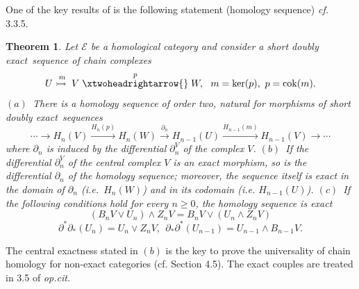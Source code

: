 \documentclass[12pt]{article}
\newtheorem{thm}{Theorem}[section]
\def\sker{{\rm ker}}
\def\scoker{{\rm cok}}
\def\exxx{{doubly exact}~}
\def\cE{{\mathcal E}}
\newcommand{\ie}{{\it i.e.\/}\ }
\newcommand{\cf}{{\it cf.}}
\newcommand{\opcit}{{\it op.cit.\/}\ }
\begin{document}
 
One of the key results of \cite{gra1} is the following statement (homology sequence) \cf~ 3.3.5.
\begin{thm}\label{homology sequence} Let $\cE$ be a homological category and consider a short \exxx sequence of chain complexes
$$
U\stackrel{m}{\rightarrowtail{}} V \stackrel{p}{\xtwoheadrightarrow{}} W, \ \ m=\sker(p), \ p=\scoker(m).
$$
	$(a)$~There is a homology sequence of order two, natural for morphisms of short \exxx sequences	\begin{equation}\label{long exact sequence}
	\cdots\longrightarrow  H_n(V)\stackrel{H_n(p)}{\longrightarrow}H_n(W)\stackrel{\partial_n}{\longrightarrow}H_{n-1}(U)\stackrel{H_{n-1}(m)}{\longrightarrow}H_{n-1}(V)\longrightarrow\cdots
	\end{equation}
where  $\partial_n$ is induced by the differential $\partial_n^V$
of the complex $V$.\newline
$(b)$~If the differential $\partial_n^V$ of the central complex $V$ is an exact morphism, so is the differential $\partial_n$ of the homology sequence; moreover, the sequence itself is exact in the domain of $\partial_n$ (\ie $H_n(W)$) and in its codomain (i.e. $H_{n-1}(U)$).\newline
$(c)$~If the following conditions hold for every $n\geq 0$, the homology sequence is exact
\begin{equation}\label{long exact sequence1}
	(B_nV\vee U_n)\wedge Z_nV=B_nV\vee(U_n\wedge Z_nV)
\end{equation}
\begin{equation}\label{long exact sequence2}
\partial^*\partial_*(U_n)=	U_n\vee Z_nV, \ \ \partial_*\partial^*(U_{n-1})=U_{n-1}\wedge B_{n-1}V.
\end{equation}
\end{thm}

 

The central exactness stated in $(b)$  
 is the key to prove the universality of chain homology for non-exact categories (cf. \cite{gra1}  Section 4.5).
The exact couples are treated in 3.5 of \opcit
\end{document}

